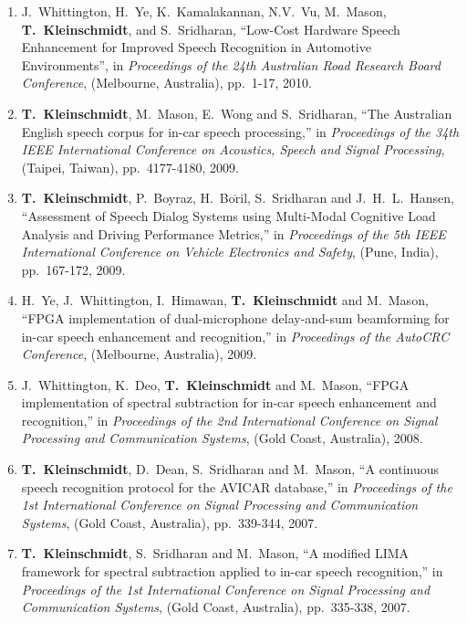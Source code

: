 \documentclass[margin,line]{resume}
\begin{document}
\begin{resume}
{\begin{enumerate}
\item J.~Whittington, H.~Ye, K.~Kamalakannan, N.V.~Vu, M.~Mason, {\bf T.~Kleinschmidt}, and S.~Sridharan, ``Low-Cost Hardware Speech Enhancement for Improved Speech Recognition in Automotive Environments'', in \emph{Proceedings of the 24th Australian Road Research Board Conference}, (Melbourne, Australia), pp.~1-17, 2010.

\item {\bf T.~Kleinschmidt}, M.~Mason, E.~Wong and
    S.~Sridharan, ``The Australian English speech corpus for
    in-car speech processing,'' in \emph{Proceedings of the
    34th IEEE International Conference on Acoustics, Speech and
    Signal Processing}, (Taipei, Taiwan), pp.~4177-4180, 2009.

\item {\bf T.~Kleinschmidt}, P.~Boyraz, H.~Bo$\mathrm{\check{r}}$il, S.~Sridharan and
    J.~H.~L.~Hansen, ``Assessment of Speech Dialog Systems using Multi-Modal Cognitive Load Analysis and Driving Performance Metrics,'' in \emph{Proceedings of the 5th IEEE International Conference on Vehicle Electronics and Safety}, (Pune, India), pp.~167-172, 2009.

\item H.~Ye, J.~Whittington, I.~Himawan, {\bf T.~Kleinschmidt}
    and M.~Mason, ``FPGA implementation of dual-microphone
    delay-and-sum beamforming for in-car speech enhancement
    and recognition,'' in {\em Proceedings of the AutoCRC
    Conference}, (Melbourne, Australia), 2009.

\item J.~Whittington, K.~Deo, {\bf T.~Kleinschmidt} and
    M.~Mason, ``FPGA implementation of spectral subtraction
    for in-car speech enhancement and recognition,'' in {\em
    Proceedings of the 2nd International Conference on Signal
    Processing and Communication Systems}, (Gold Coast,
    Australia), 2008.

\item {\bf T.~Kleinschmidt}, D.~Dean, S.~Sridharan and
    M.~Mason, ``A continuous speech recognition protocol for
    the AVICAR database,'' in \emph{Proceedings of the 1st
    International Conference on Signal Processing and
    Communication Systems}, (Gold Coast, Australia),
    pp.~339-344, 2007.

\item {\bf T.~Kleinschmidt}, S.~Sridharan and M.~Mason, ``A
    modified LIMA framework for spectral subtraction applied
    to in-car speech recognition,'' in \emph{Proceedings of
    the 1st International Conference on Signal Processing and
    Communication Systems}, (Gold Coast, Australia),
    pp.~335-338, 2007.
\end{enumerate}
}


\end{resume}
\end{document}
